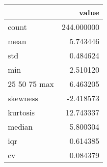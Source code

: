 \begin{tabular}{lr}
\toprule
 & value \\
\midrule
count & 244.000000 \\
mean & 5.743446 \\
std & 0.484624 \\
min & 2.510120 \\
25%
50%
75%
max & 6.463205 \\
skewness & -2.418573 \\
kurtosis & 12.743337 \\
median & 5.800304 \\
iqr & 0.614385 \\
cv & 0.084379 \\
\bottomrule
\end{tabular}
